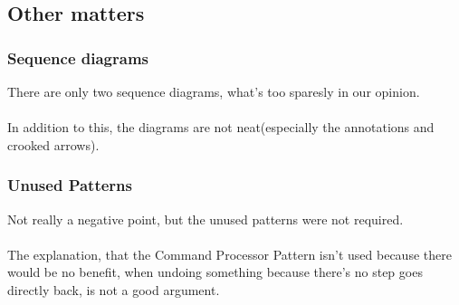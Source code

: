 \documentclass{article}
\begin{document}
\subsection{Other matters}
\subsubsection{Sequence diagrams}
There are only two sequence diagrams, what's too sparesly in our opinion.\\\\
In addition to this, the diagrams are not neat(especially the annotations and crooked arrows).
\subsubsection{Unused Patterns}
Not really a negative point, but the unused patterns were not required.\\\\
The explanation, that the Command Processor Pattern isn't used because there would be no benefit, when undoing something because there's no step goes directly back, is not a good argument.
\end{document}
